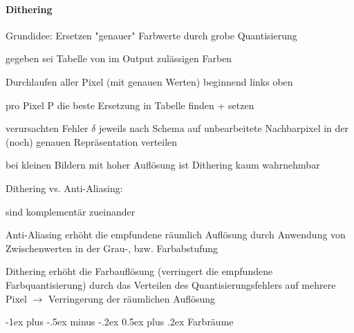 \documentclass[landscape]{article}
\makeatletter
\renewcommand{\section}{\@startsection{section}{1}{0mm}%
                                {-1ex plus -.5ex minus -.2ex}%
                                {0.5ex plus .2ex}%
                                {\normalfont\large\bfseries}}
\makeatother
\begin{document}
\begin{multicols}{3}
  \paragraph{Dithering}
  \begin{itemize*}
    \item Grundidee: Ersetzen "genauer" Farbwerte durch grobe Quantisierung
    \item gegeben sei Tabelle von im Output zulässigen Farben
    \item Durchlaufen aller Pixel (mit genauen Werten) beginnend links oben
    \item pro Pixel P die beste Ersetzung in Tabelle finden + setzen
    \item verursachten Fehler $\delta$ jeweils nach Schema auf unbearbeitete Nachbarpixel in der (noch) genauen Repräsentation verteilen
    \item bei kleinen Bildern mit hoher Auflösung ist Dithering kaum wahrnehmbar
  \end{itemize*}
  Dithering vs. Anti-Aliasing:
  \begin{itemize*}
    \item sind komplementär zueinander
    \item Anti-Aliasing erhöht die empfundene räumlich Auflösung durch Anwendung von Zwischenwerten in der Grau-, bzw. Farbabstufung
    \item Dithering erhöht die Farbauflösung (verringert die empfundene Farbquantisierung) durch das Verteilen des Quantisierungsfehlers auf mehrere Pixel $\rightarrow$ Verringerung der räumlichen Auflösung
  \end{itemize*}
  
  \section{Farbräume}

\end{multicols}
\end{document}
